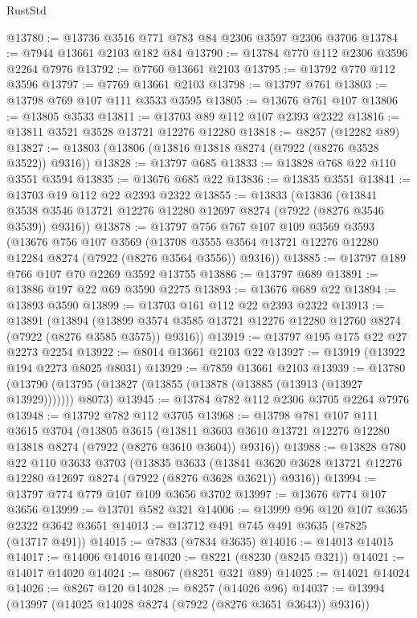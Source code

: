 \begin{lexlean}{RustStd}
\begin{coremodule}
@13780 := @13736 @3516 @771 @783 @84 @2306 @3597 @2306 @3706
@13784 := @7944 @13661 @2103 @182 @84
@13790 := @13784 @770 @112 @2306 @3596 @2264 @7976
@13792 := @7760 @13661 @2103
@13795 := @13792 @770 @112 @3596
@13797 := @7769 @13661 @2103
@13798 := @13797 @761
@13803 := @13798 @769 @107 @111 @3533 @3595
@13805 := @13676 @761 @107
@13806 := @13805 @3533
@13811 := @13703 @89 @112 @107 @2393 @2322
@13816 := @13811 @3521 @3528 @13721 @12276 @12280
@13818 := @8257 (@12282 @89)
@13827 := @13803 (@13806 (@13816 @13818 @8274 (@7922 (@8276 @3528 @3522)) @9316))
@13828 := @13797 @685
@13833 := @13828 @768 @22 @110 @3551 @3594
@13835 := @13676 @685 @22
@13836 := @13835 @3551
@13841 := @13703 @19 @112 @22 @2393 @2322
@13855 := @13833
    (@13836
      (@13841 @3538 @3546 @13721 @12276 @12280 @12697 @8274 (@7922 (@8276 @3546 @3539)) @9316))
@13878 := @13797
    @756
    @767
    @107
    @109
    @3569
    @3593
    (@13676
      @756
      @107
      @3569
      (@13708 @3555 @3564 @13721 @12276 @12280 @12284 @8274 (@7922 (@8276 @3564 @3556)) @9316))
@13885 := @13797 @189 @766 @107 @70 @2269 @3592 @13755
@13886 := @13797 @689
@13891 := @13886 @197 @22 @69 @3590 @2275
@13893 := @13676 @689 @22
@13894 := @13893 @3590
@13899 := @13703 @161 @112 @22 @2393 @2322
@13913 := @13891
    (@13894
      (@13899 @3574 @3585 @13721 @12276 @12280 @12760 @8274 (@7922 (@8276 @3585 @3575)) @9316))
@13919 := @13797 @195 @175 @22 @27 @2273 @2254
@13922 := @8014 @13661 @2103 @22
@13927 := @13919 (@13922 @194 @2273 @8025 @8031)
@13929 := @7859 @13661 @2103
@13939 := @13780
    (@13790 (@13795 (@13827 (@13855 (@13878 (@13885 (@13913 (@13927 @13929))))))) @8073)
@13945 := @13784 @782 @112 @2306 @3705 @2264 @7976
@13948 := @13792 @782 @112 @3705
@13968 := @13798
    @781
    @107
    @111
    @3615
    @3704
    (@13805
      @3615
      (@13811 @3603 @3610 @13721 @12276 @12280 @13818 @8274 (@7922 (@8276 @3610 @3604)) @9316))
@13988 := @13828
    @780
    @22
    @110
    @3633
    @3703
    (@13835
      @3633
      (@13841 @3620 @3628 @13721 @12276 @12280 @12697 @8274 (@7922 (@8276 @3628 @3621)) @9316))
@13994 := @13797 @774 @779 @107 @109 @3656 @3702
@13997 := @13676 @774 @107 @3656
@13999 := @13701 @582 @321
@14006 := @13999 @96 @120 @107 @3635 @2322 @3642 @3651
@14013 := @13712 @491 @745 @491 @3635 (@7825 (@13717 @491))
@14015 := @7833 (@7834 @3635)
@14016 := @14013 @14015
@14017 := @14006 @14016
@14020 := @8221 (@8230 (@8245 @321))
@14021 := @14017 @14020
@14024 := @8067 (@8251 @321 @89)
@14025 := @14021 @14024
@14026 := @8267 @120
@14028 := @8257 (@14026 @96)
@14037 := @13994 (@13997 (@14025 @14028 @8274 (@7922 (@8276 @3651 @3643)) @9316))

\end{coremodule}
\end{lexlean}
